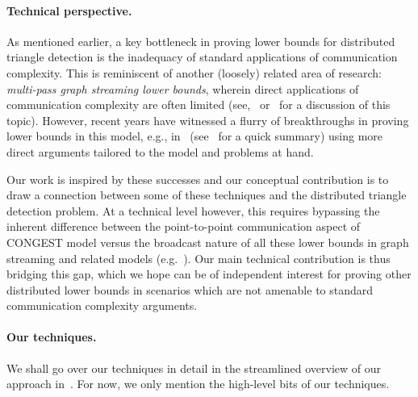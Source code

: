 \documentclass[11pt]{article}
\theoremstyle{definition}
\begin{document}
\paragraph{Technical perspective.} As mentioned earlier, a key bottleneck in proving lower bounds for distributed triangle detection is the inadequacy of standard applications of communication complexity. 
This is reminiscent of another (loosely) related area of research: \emph{multi-pass graph streaming lower bounds}, wherein direct applications of communication complexity are often limited (see,~\cite{AssadiCK19} or~\cite{Assadi23}
for a discussion of this topic). However, recent years have witnessed a flurry of breakthroughs in proving lower bounds in this model, e.g., in~\cite{GuruswamiO16,AssadiR20,ChenKPSSY21,AssadiKNS24} (see~\cite{Assadi23} for a quick summary) using more direct arguments tailored to the model and problems at hand. 

Our work is inspired by these successes and our conceptual contribution is to draw a connection between some of these techniques and the distributed triangle detection problem. At a technical level however, 
this requires bypassing the inherent difference between the point-to-point communication aspect of CONGEST model versus the broadcast nature of all these lower bounds in
graph streaming and related models (e.g.~\cite{AlonNRW15,AssadiKZ22}). Our main technical contribution is thus bridging this gap, which we hope can be of independent interest
for proving other distributed lower bounds in scenarios which are not amenable to standard communication complexity arguments.


\paragraph{Our techniques.} We shall go over our techniques in detail in the streamlined overview of our approach in~. For now, we only mention the high-level bits of our techniques.
\end{document}
